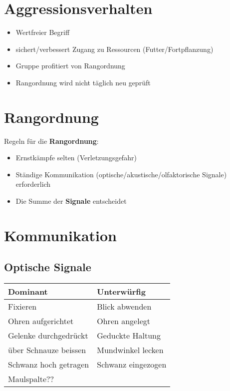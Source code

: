 \section{Aggressionsverhalten}
\begin{itemize}
    \item Wertfreier Begriff
    \item sichert/verbessert Zugang zu Ressourcen (Futter/Fortpflanzung)
    \item Gruppe profitiert von Rangordnung
    \item Rangordnung wird nicht täglich neu geprüft
\end{itemize}


\section{Rangordnung}
Regeln für die \textbf{Rangordnung}:
\begin{itemize}
    \item Ernstkämpfe selten (Verletzungsgefahr)
    \item Ständige Kommunikation (optische/akustische/olfaktorische Signale) erforderlich
    \item Die Summe der \textbf{Signale} entscheidet
\end{itemize}


\section{Kommunikation}

    \subsection{Optische Signale}
    \begin{tabular}{l|l}
        \textbf{Dominant}       & \textbf{Unterwürfig} \\
        \hline
        Fixieren                & Blick abwenden \\
        Ohren aufgerichtet      & Ohren angelegt \\
        Gelenke durchgedrückt   & Geduckte Haltung \\
        über Schnauze beissen   & Mundwinkel lecken \\
        Schwanz hoch getragen   & Schwanz eingezogen \\
        Maulspalte?? \\
    \end{tabular}

